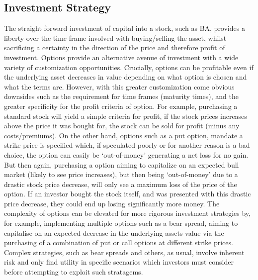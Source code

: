 \documentclass[
	a4paper, %
	11pt, %
	twoside, %
]{LTJournalArticle}
\begin{document}
\subsection{Investment Strategy}
The straight forward investment of capital into a stock, such as BA, provides a liberty over the time frame involved with buying/selling the asset, whilst sacrificing a certainty in the direction of the price and therefore profit of investment.
Options provide an alternative avenue of investment with a wide variety of customization opportunities.
Crucially, options can be profitable even if the underlying asset decreases in value depending on what option is chosen and what the terms are. 
However, with this greater customization come obvious downsides such as the requirement for time frames (maturity times), and the greater specificity for the profit criteria of option. 
For example, purchasing a standard stock will yield a simple criteria for profit, if the stock prices increases above the price it was bought for, the stock can be sold for profit (minus any costs/premiums).
On the other hand, options such as a put option, mandate a strike price is specified which, if speculated poorly or for another reason is a bad choice, the option can easily be `out-of-money' generating a net loss for no gain.
But then again, purchasing a option aiming to capitalize on an expected bull market (likely to see price increases), but then being `out-of-money' due to a drastic stock price decrease, will only see a maximum loss of the price of the option.
If an investor bought the stock itself, and was presented with this drastic price decrease, they could end up losing significantly more money.
The complexity of options can be elevated for more rigorous investment strategies by, for example, implementing multiple options such as a bear spread, aiming to capitalise on an expected decrease in the underlying assets value via the purchasing of a combination of put or call options at different strike prices.
Complex strategies, such as bear spreads and others, as usual, involve inherent risk and only find utility in specific scenarios which investors must consider before attempting to exploit such stratagems. 
\end{document}
